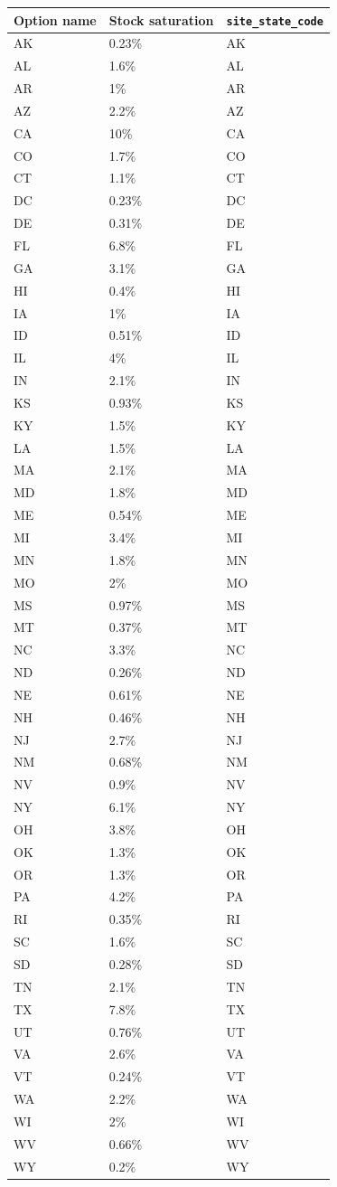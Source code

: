 \begin{longtable}[]{@{}lll@{}}
\toprule\noalign{}
Option name & Stock saturation & \texttt{site\_state\_code} \\
\midrule\noalign{}
\endhead
\bottomrule\noalign{}
\endlastfoot
AK & 0.23\% & AK \\
AL & 1.6\% & AL \\
AR & 1\% & AR \\
AZ & 2.2\% & AZ \\
CA & 10\% & CA \\
CO & 1.7\% & CO \\
CT & 1.1\% & CT \\
DC & 0.23\% & DC \\
DE & 0.31\% & DE \\
FL & 6.8\% & FL \\
GA & 3.1\% & GA \\
HI & 0.4\% & HI \\
IA & 1\% & IA \\
ID & 0.51\% & ID \\
IL & 4\% & IL \\
IN & 2.1\% & IN \\
KS & 0.93\% & KS \\
KY & 1.5\% & KY \\
LA & 1.5\% & LA \\
MA & 2.1\% & MA \\
MD & 1.8\% & MD \\
ME & 0.54\% & ME \\
MI & 3.4\% & MI \\
MN & 1.8\% & MN \\
MO & 2\% & MO \\
MS & 0.97\% & MS \\
MT & 0.37\% & MT \\
NC & 3.3\% & NC \\
ND & 0.26\% & ND \\
NE & 0.61\% & NE \\
NH & 0.46\% & NH \\
NJ & 2.7\% & NJ \\
NM & 0.68\% & NM \\
NV & 0.9\% & NV \\
NY & 6.1\% & NY \\
OH & 3.8\% & OH \\
OK & 1.3\% & OK \\
OR & 1.3\% & OR \\
PA & 4.2\% & PA \\
RI & 0.35\% & RI \\
SC & 1.6\% & SC \\
SD & 0.28\% & SD \\
TN & 2.1\% & TN \\
TX & 7.8\% & TX \\
UT & 0.76\% & UT \\
VA & 2.6\% & VA \\
VT & 0.24\% & VT \\
WA & 2.2\% & WA \\
WI & 2\% & WI \\
WV & 0.66\% & WV \\
WY & 0.2\% & WY \\
\end{longtable}

